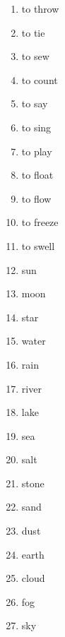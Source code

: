 \begin{enumerate}
\item   to throw 

\item   to tie 

\item   to sew 

\item   to count 

\item   to say 

\item   to sing 

\item   to play 

\item   to float 

\item   to flow 

\item   to freeze 

\item   to swell 

\item   sun 

\item   moon 

\item   star 

\item   water 

\item   rain 

\item   river 

\item   lake 

\item   sea 

\item   salt 

\item   stone 

\item   sand 

\item   dust 

\item   earth 

\item   cloud 

\item   fog 

\item   sky 


\end{enumerate}
